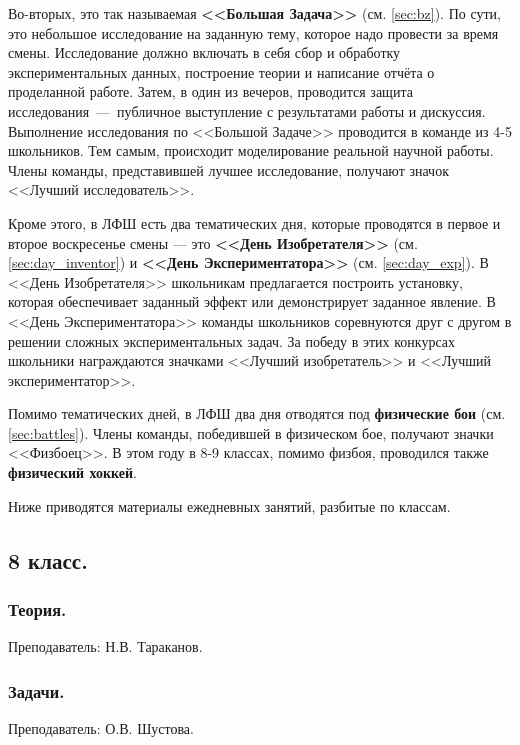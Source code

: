 \documentclass[12pt,a4paper,oneside]{scrartcl}
\begin{document}
Во-вторых, это так называемая \textbf{<<Большая Задача>>}
(см. \ref{sec:bz}). По сути, это небольшое исследование на заданную
тему, которое надо провести за время смены. Исследование должно
включать в себя сбор и обработку экспериментальных данных, построение
теории и написание отчёта о проделанной работе. Затем, в один из
вечеров, проводится защита исследования~---~публичное выступление с
результатами работы и дискуссия. Выполнение исследования по <<Большой
Задаче>> проводится в команде из 4-5 школьников. Тем самым, происходит
моделирование реальной научной работы. Члены команды, представившей
лучшее исследование, получают значок <<Лучший исследователь>>.

Кроме этого, в ЛФШ есть два тематических дня, которые проводятся в
первое и второе воскресенье смены --- это \textbf{<<День Изобретателя>>}
(см. \ref{sec:day_inventor}) и \textbf{<<День Экспериментатора>>}
(см. \ref{sec:day_exp}). В <<День Изобретателя>> школьникам
предлагается построить установку, которая обеспечивает заданный эффект
или демонстрирует заданное явление. В <<День Экспериментатора>>
команды школьников соревнуются друг с другом в решении сложных
экспериментальных задач. За победу в этих конкурсах школьники
награждаются значками <<Лучший изобретатель>> и <<Лучший
экспериментатор>>.

Помимо тематических дней, в ЛФШ два дня отводятся под
\textbf{физические бои} (см. \ref{sec:battles}). Члены команды,
победившей в физическом бое, получают значки <<Физбоец>>. В этом году
в 8-9 классах, помимо физбоя, проводился также \textbf{физический
  хоккей}.

Ниже приводятся материалы ежедневных занятий, разбитые по классам. 

\subsection{8 класс.}
\label{sec:daily_8}

\subsubsection{Теория.}
\label{sec:daily_8_th}

\textsf{Преподаватель: Н.В. Тараканов.}

\subsubsection{Задачи.}
\label{sec:daily_8_problems}

\textsf{Преподаватель: О.В. Шустова.}
\end{document}
